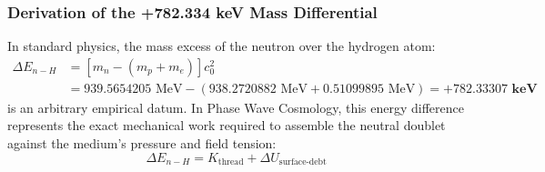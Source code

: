 \documentclass[11pt,a4paper]{article}
\begin{document}
\subsubsection{Derivation of the +782.334 keV Mass Differential}
\label{subsubsec:mass_diff_782}

In standard physics, the mass excess of the neutron over the hydrogen atom:
\begin{equation}
\begin{aligned}
\Delta E_{n-H} &= [m_n - (m_p + m_e)] c_0^2 \\
&= 939.5654205\text{ MeV} - (938.2720882\text{ MeV} + 0.51099895\text{ MeV}) = \mathbf{+782.33307\text{ keV}}
\end{aligned}
\end{equation}
is an arbitrary empirical datum. In Phase Wave Cosmology, this energy difference represents the exact mechanical work required to assemble the neutral doublet against the medium's pressure and field tension:
\begin{equation}
\Delta E_{n-H} = K_{\text{thread}} + \Delta U_{\text{surface-debt}}
\end{equation}
\end{document}
